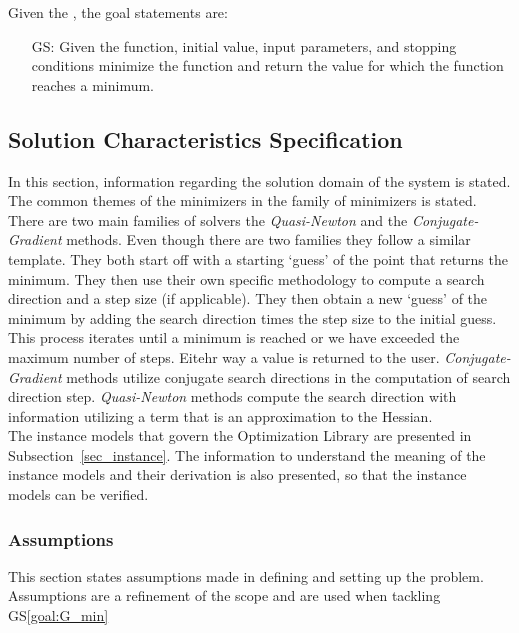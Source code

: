 \documentclass[12pt]{article}
\newcounter{goalnum} %
\begin{document}
\noindent Given the , the goal statements are:
\fi

\begin{itemize}

\item[GS\refstepcounter{goalnum}\thegoalnum \label{goal:G_min}:] Given the function, initial value, input parameters, and stopping conditions minimize the function and return the value for which the function reaches a minimum.

\end{itemize}

\subsection{Solution Characteristics Specification}
In this section, information regarding the solution domain of the system is stated. The common themes of the minimizers in the family of minimizers is stated. There are two main families of solvers the \textit{Quasi-Newton} and the \textit{Conjugate-Gradient} methods. Even though there are two families they follow a similar template. They both start off with a starting `guess' of the point that returns the minimum. They then use their own specific methodology to compute a search direction and a step size (if applicable). They then obtain a new `guess' of the minimum by adding the search direction times the step size to the initial guess. This process iterates until a minimum is reached or we have exceeded the maximum number of steps. Eitehr way a value is returned to the user. \textit{Conjugate-Gradient} methods utilize conjugate search directions in the computation of search direction step. \textit{Quasi-Newton} methods compute the search direction with information utilizing a term that is an approximation to the Hessian.  
\\

The instance models that govern the Optimization Library are presented in
Subsection~\ref{sec_instance}.  The information to understand the meaning of the
instance models and their derivation is also presented, so that the instance
models can be verified.


\subsubsection{Assumptions} \label{sec_assumpt}
This section states assumptions made in defining and setting up the problem. Assumptions are a refinement of the scope and are used when tackling GS\ref{goal:G_min}
\\
\end{document}
